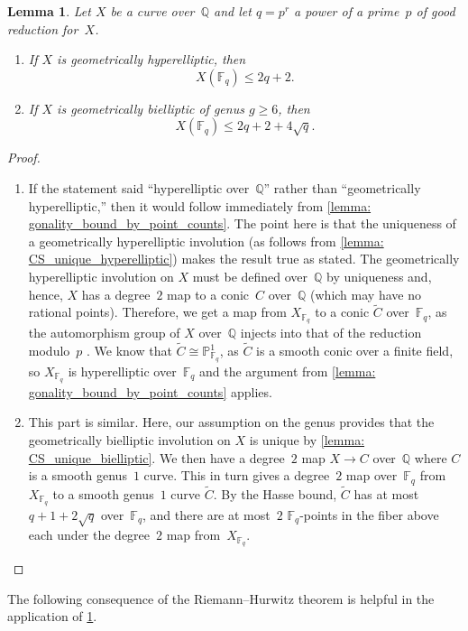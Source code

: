 \documentclass[11pt,reqno]{amsart}
\newcommand{\F}{\mathbb{F}}
\newcommand{\Q}{\mathbb{Q}}
\newtheorem{lemma}[theorem]{Lemma}
\theoremstyle{definition}
\begin{document}
\begin{lemma}\label{lemma: hyperelliptic_bielliptic_point_count_bounds}
Let $X$ be a curve over~$\Q$ and let $q = p^r$ a power of a prime~$p$ of good reduction for~$X$. 
\begin{enumerate}
    \item If $X$ is geometrically hyperelliptic, then
\[ X(\F_q) \leq 2q+2. \]
    \item If $X$ is geometrically bielliptic of genus $g \geq 6$, then 
    \[ X(\F_q) \leq 2q+2+4\sqrt{q}. \]
\end{enumerate}
\end{lemma}
\begin{proof}\phantom{a}
\begin{enumerate}
\item If the statement said ``hyperelliptic over~$\Q$'' rather than ``geometrically hyperelliptic,'' then it would follow immediately from \cref{lemma: gonality_bound_by_point_counts}. The point here is that the uniqueness of a geometrically hyperelliptic involution (as follows from \cref{lemma: CS_unique_hyperelliptic}) makes the result true as stated. The geometrically hyperelliptic involution on $X$ must be defined over~$\Q$ by uniqueness and, hence, $X$ has a degree~$2$ map to a conic~$C$ over~$\Q$ (which may have no rational points). Therefore, we get a map from $X_{\F_q}$ to a conic $\widetilde{C}$ over~$\F_q$, as the automorphism group of $X$ over~$\Q$ injects into that of the reduction modulo~$p$ \cite[Proposition~3.38, Chapter~10]{Liu}. We know that $\widetilde{C} \cong \mathbb{P}^1_{\F_q}$, as $\widetilde{C}$ is a smooth conic over a finite field, so $X_{\F_q}$ is hyperelliptic over~$\F_q$ and the argument from \cref{lemma: gonality_bound_by_point_counts} applies. 
\item This part is similar. Here, our assumption on the genus provides that the geometrically bielliptic involution on $X$ is unique by \cref{lemma: CS_unique_bielliptic}. We then have a degree~$2$ map $X \to C$ over~$\Q$ where $C$ is a smooth genus~$1$ curve. This in turn gives a degree~$2$ map over~$\F_q$ from $X_{\F_q}$ to a smooth genus~$1$ curve $\widetilde{C}$. By the Hasse bound, $\widetilde{C}$ has at most $q+1+2\sqrt{q}$ over~$\F_q$, and there are at most~$2$ $\F_q$-points in the fiber above each under the degree~$2$ map from~$X_{\F_q}$. 
\end{enumerate}
\end{proof}

The following consequence of the Riemann--Hurwitz theorem is helpful in the application of \cref{lemma: hyperelliptic_bielliptic_point_count_bounds}.
\end{document}
